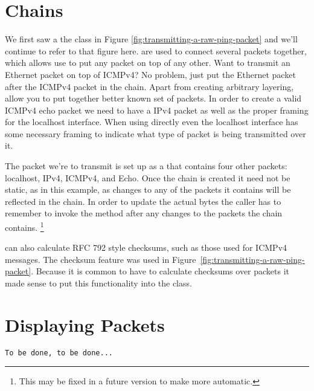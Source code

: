 \documentclass[11pt]{article}
\begin{document}
\section{Chains}
\label{sec:chains}

We first saw a the  class in Figure
\ref{fig:transmitting-a-raw-ping-packet} and we'll continue to refer
to that figure here.   are used to connect several
packets together, which allows use to put any packet on top of any
other.  Want to transmit an Ethernet packet on top of ICMPv4?  No
problem, just put the Ethernet packet after the ICMPv4 packet in the
chain.  Apart from creating arbitrary layering,  allow
you to put together better known set of packets.  In order to create a
valid ICMPv4 echo packet we need to have a IPv4 packet as well as the
proper framing for the localhost interface.  When using 
directly even the localhost interface has some necessary framing to
indicate what type of packet is being transmitted over it.  

The packet we're to transmit is set up as a  that
contains four other packets: localhost, IPv4, ICMPv4, and Echo.  Once
the chain is created it need not be static, as in this example, as
changes to any of the packets it contains will be reflected in the
chain.  In order to update the actual bytes the caller has to remember
to invoke the  method after any changes to the packets
the chain contains.  \footnote{This may be fixed in a future version
  to make  more automatic.}

 can also calculate RFC 792 style checksums, such as
those used for ICMPv4 messages.  The checksum feature was used in
Figure~\ref{fig:transmitting-a-raw-ping-packet}.  Because it is common
to have to calculate checksums over packets it made sense to put this
functionality into the  class.

\section{Displaying Packets}
\label{sec:displaying-packets}

\begin{Verbatim}
To be done, to be done...
\end{Verbatim}
\end{document}
